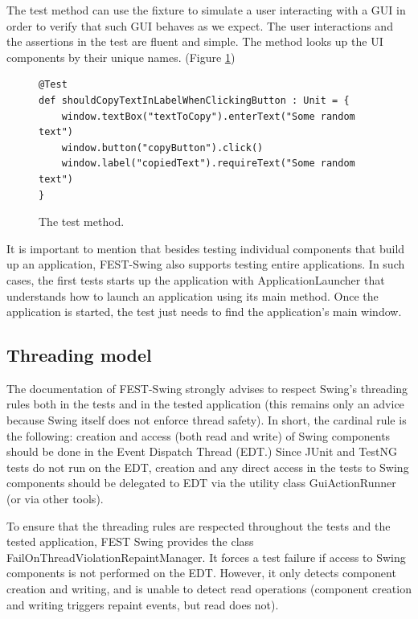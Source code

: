 The test method can use the fixture to simulate a user interacting with a GUI in order to verify that such GUI behaves as we expect. The user interactions and the assertions in the test are fluent and simple. The method looks up the UI components by their unique names. (Figure \ref{fig:example_test_method})

\begin{figure}[h!] \label{fig:example_test_method}
\begin{lstlisting}
@Test 
def shouldCopyTextInLabelWhenClickingButton : Unit = {
    window.textBox("textToCopy").enterText("Some random text")
    window.button("copyButton").click()
    window.label("copiedText").requireText("Some random text")
}
\end{lstlisting}
\caption{The test method.}
\end{figure}

It is important to mention that besides testing individual components that build up an application, FEST-Swing also supports testing entire applications. In such cases, the first tests starts up the application with ApplicationLauncher that understands how to launch an application using its main method. Once the application is started, the test just needs to find the application's main window.

\subsection{Threading model}

The documentation of FEST-Swing strongly advises to respect Swing's threading rules \cite{OracleSwingThreading} both in the tests and in the tested application (this remains only an advice because Swing itself does not enforce thread safety). In short, the cardinal rule is the following: creation and access (both read and write) of Swing components should be done in the Event Dispatch Thread (EDT.) Since JUnit and TestNG tests do not run on the EDT, creation and any direct access in the tests to Swing components should be delegated to EDT via the utility class GuiActionRunner (or via other tools).

To ensure that the threading rules are respected throughout the tests and the tested application, FEST Swing provides the class FailOnThreadViolationRepaintManager. It forces a test failure if access to Swing components is not performed on the EDT. However, it only detects component creation and writing, and is unable to detect read operations (component creation and writing triggers repaint events, but read does not).


